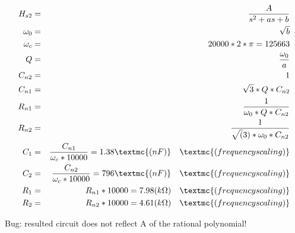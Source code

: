 ﻿\documentclass[a4j]{jarticle}
\begin{document}
\begin{eqnarray*}
H_{s2}   &=& \frac{A}{s^2+as+b} \\
\omega_0 &=& \sqrt{b} \\
\omega_c &=& 20000 * 2 * \pi = 125663 \\
Q        &=& \frac{\omega_0}{a} \\
C_{n2}   &=& 1 \\
C_{n1}   &=& \sqrt{3}*Q*C_{n2} \\
R_{n1}   &=& \frac{1}{\omega_0 * Q * C_{n2}} \\
R_{n2}   &=& \frac{1}{\sqrt(3)*\omega_0 *C_{n2}} \\
C_{1}    &=& \frac{C_{n1}}{\omega_c * 10000} = 1.38 \textmc{(nF)} \quad \textmc{(frequency scaling)} \\
C_{2}    &=& \frac{C_{n2}}{\omega_c * 10000} = 796 \textmc{(nF)} \quad \textmc{(frequency scaling)}  \\
R_{1}    &=& R_{n1} * 10000 = 7.98 (k\Omega) \quad \textmc{(frequency scaling)}  \\
R_{2}    &=& R_{n2} * 10000 = 4.61 (k\Omega) \quad \textmc{(frequency scaling)} 
\end{eqnarray*}

Bug: resulted circuit does not reflect A of the rational polynomial!
\end{document}
